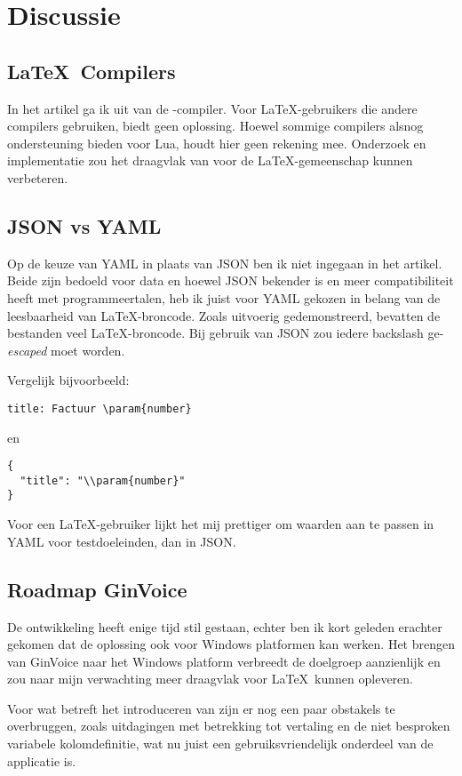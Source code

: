 \section{Discussie}

\subsection{\LaTeX\ Compilers}
In het artikel ga ik uit van de \LuaLaTeX-compiler.
Voor \LaTeX-gebruikers die andere compilers gebruiken, biedt  geen oplossing.
Hoewel sommige compilers alsnog ondersteuning bieden voor Lua, houdt  hier geen rekening mee.
Onderzoek en implementatie zou het draagvlak van  voor de \LaTeX-gemeenschap kunnen verbeteren.

\subsection{JSON vs YAML}
Op de keuze van YAML in plaats van JSON ben ik niet ingegaan in het artikel. Beide zijn bedoeld voor data en
hoewel JSON bekender is en meer compatibiliteit heeft met programmeertalen, heb ik juist voor YAML gekozen in belang van de leesbaarheid van \LaTeX-broncode.
Zoals uitvoerig gedemonstreerd, bevatten de bestanden veel \LaTeX-broncode.
Bij gebruik van JSON zou iedere backslash ge-\textit{escaped} moet worden.

Vergelijk bijvoorbeeld:
\begin{verbatim}
title: Factuur \param{number}
\end{verbatim}
en
\begin{verbatim}
{
  "title": "\\param{number}"
}
\end{verbatim}

Voor een \LaTeX-gebruiker lijkt het mij prettiger om waarden aan te passen in YAML voor testdoeleinden, dan in JSON\@.

\newpage
\subsection{Roadmap GinVoice}
De ontwikkeling heeft enige tijd stil gestaan, echter ben ik kort geleden erachter gekomen dat de oplossing ook voor Windows platformen kan werken.
Het brengen van GinVoice naar het Windows platform verbreedt de doelgroep aanzienlijk en zou naar mijn verwachting meer draagvlak voor \LaTeX\ kunnen opleveren.

Voor wat betreft het introduceren van  zijn er nog een paar obstakels te overbruggen, zoals uitdagingen met betrekking tot vertaling en de niet besproken variabele kolomdefinitie, wat nu juist een gebruiksvriendelijk onderdeel van de applicatie is.
